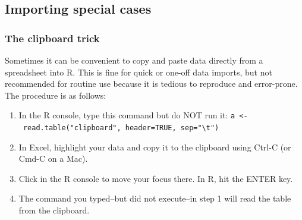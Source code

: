 \documentclass[
  13,
  letterpaper,
]{report}
\newenvironment{Shaded}{\begin{snugshade}}{\end{snugshade}}
\newcommand{\AttributeTok}[1]{\textcolor[rgb]{0.40,0.45,0.13}{#1}}
\newcommand{\CommentTok}[1]{\textcolor[rgb]{0.37,0.37,0.37}{#1}}
\newcommand{\FunctionTok}[1]{\textcolor[rgb]{0.28,0.35,0.67}{#1}}
\newcommand{\NormalTok}[1]{\textcolor[rgb]{0.00,0.23,0.31}{#1}}
\newcommand{\OtherTok}[1]{\textcolor[rgb]{0.00,0.23,0.31}{#1}}
\newcommand{\SpecialCharTok}[1]{\textcolor[rgb]{0.37,0.37,0.37}{#1}}
\newcommand{\StringTok}[1]{\textcolor[rgb]{0.13,0.47,0.30}{#1}}
\providecommand{\tightlist}{%
  \setlength{\itemsep}{0pt}\setlength{\parskip}{0pt}}
\begin{document}
\begin{Shaded}
\end{Shaded}

\subsection{Importing special cases}\label{sec-ie-import-special}

\subsubsection{The clipboard trick}\label{sec-ie-import-special-clip}

Sometimes it can be convenient to copy and paste data directly from a
spreadsheet into R. This is fine for quick or one-off data imports, but
not recommended for routine use because it is tedious to reproduce and
error-prone. The procedure is as follows:

\begin{enumerate}
\def\labelenumi{\arabic{enumi}.}
\tightlist
\item
  In the R console, type this command but do NOT run it:
  \texttt{a\ \textless{}-\ read.table("clipboard",\ header=TRUE,\ sep="\textbackslash{}t")}
\item
  In Excel, highlight your data and copy it to the clipboard using
  Ctrl-C (or Cmd-C on a Mac).
\item
  Click in the R console to move your focus there. In R, hit the ENTER
  key.
\item
  The command you typed--but did not execute--in step 1 will read the
  table from the clipboard.
\end{enumerate}
\end{document}
